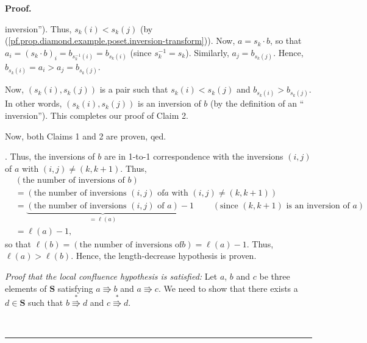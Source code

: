 \documentclass[numbers=enddot,12pt,final,onecolumn,notitlepage]{scrartcl}%
\theoremstyle{definition}
\newenvironment{proof}[1][Proof]{\noindent\textbf{#1.} }{\ \rule{0.5em}{0.5em}}
\newenvironment{verlong}{}{}
\newenvironment{vershort}{}{}
\begin{document}
\begin{proof}
\begin{verlong}
{inversion\textquotedblright). Thus, $s_{k}\left(  i\right)  <s_{k}\left(
j\right)  $ (by (\ref{pf.prop.diamond.example.poset.inversion-transform})).
Now, $a=s_{k}\cdot b$, so that $a_{i}=\left(  s_{k}\cdot b\right)
_{i}=b_{s_{k}^{-1}\left(  i\right)  }=b_{s_{k}\left(  i\right)  }$ (since
$s_{k}^{-1}=s_{k}$). Similarly, $a_{j}=b_{s_{k}\left(  j\right)  }$. Hence,
$b_{s_{k}\left(  i\right)  }=a_{i}>a_{j}=b_{s_{k}\left(  j\right)  }$.
\par
Now, $\left(  s_{k}\left(  i\right)  ,s_{k}\left(  j\right)  \right)  $ is a
pair such that $s_{k}\left(  i\right)  <s_{k}\left(  j\right)  $ and
$b_{s_{k}\left(  i\right)  }>b_{s_{k}\left(  j\right)  }$. In other words,
$\left(  s_{k}\left(  i\right)  ,s_{k}\left(  j\right)  \right)  $ is an
inversion of $b$ (by the definition of an \textquotedblleft
inversion\textquotedblright). This completes our proof of Claim 2.
\par
Now, both Claims 1 and 2 are proven, qed.}. Thus, the inversions of $b$ are in
1-to-1 correspondence with the inversions $\left(  i,j\right)  $ of $a$ with
$\left(  i,j\right)  \neq\left(  k,k+1\right)  $. Thus,%
\begin{align*}
&  \left(  \text{the number of inversions of }b\right) \\
&  =\left(  \text{the number of inversions }\left(  i,j\right)  \text{ of
}a\text{ with }\left(  i,j\right)  \neq\left(  k,k+1\right)  \right) \\
&  =\underbrace{\left(  \text{the number of inversions }\left(  i,j\right)
\text{ of }a\right)  }_{=\ell\left(  a\right)  }-1\ \ \ \ \ \ \ \ \ \ \left(
\text{since }\left(  k,k+1\right)  \text{ is an inversion of }a\right) \\
&  =\ell\left(  a\right)  -1,
\end{align*}
so that $\ell\left(  b\right)  =\left(  \text{the number of inversions of
}b\right)  =\ell\left(  a\right)  -1$. Thus, $\ell\left(  a\right)
>\ell\left(  b\right)  $. Hence, the length-decrease hypothesis is proven.
\end{verlong}

\begin{vershort}
\textit{Proof that the local confluence hypothesis is satisfied:} Let $a$, $b$
and $c$ be three elements of $\mathbf{S}$ satisfying $a\Rrightarrow b$ and
$a\Rrightarrow c$. We need to show that there exists a $d\in\mathbf{S}$ such
that $b\overset{\ast}{\Rrightarrow}d$ and $c\overset{\ast}{\Rrightarrow}d$.


\end{vershort}
\end{proof}
\end{document}
